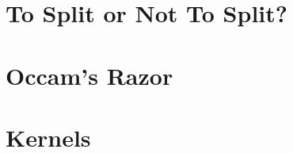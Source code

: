 \documentclass[12pt]{article}
\begin{document}
\section{To Split or Not To Split?}



\section{Occam's Razor}



\section{Kernels}


\end{document}
